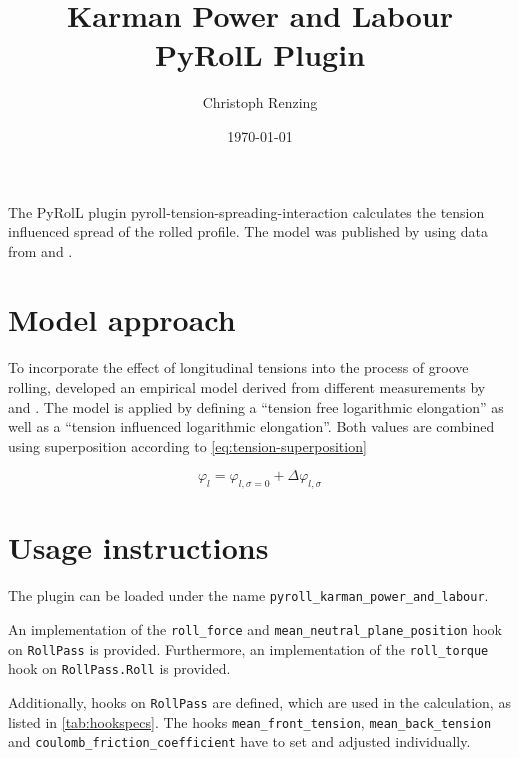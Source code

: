 \documentclass[11pt]{PyRollDocs}
\begin{document}
    \title{Karman Power and Labour PyRolL Plugin}
    \author{Christoph Renzing}
    \date{\today}

    \maketitle

    The PyRolL plugin pyroll-tension-spreading-interaction calculates the tension influenced spread of the rolled profile.
    The model was published by \textcite{Dobler1998, MaukDobler1999} using data from \textcite{Nikkilä1977} and \textcite{Treis1968}.


    \section{Model approach}\label{sec:model-approach}
    To incorporate the effect of longitudinal tensions into the process of groove rolling, \textcite{Dobler1998} developed an empirical model derived from different measurements by \textcite{Nikkilä1977} and \textcite{Treis1968}.
    The model is applied by defining a \enquote{tension free logarithmic elongation} as well as a \enquote{tension influenced logarithmic elongation}.
    Both values are combined using superposition according to \autoref{eq:tension-superposition}

    \begin{equation}
        \varphi_l = \varphi_{l, \sigma=0} + \Delta\varphi_{l, \sigma}
        \label{eq:tension-superposition}
    \end{equation}

    \section{Usage instructions}\label{sec:usage-instructions}
    The plugin can be loaded under the name \texttt{pyroll\_karman\_power\_and\_labour}.

    An implementation of the \lstinline{roll_force} and \lstinline{mean_neutral_plane_position} hook on \lstinline{RollPass} is provided.
    Furthermore, an implementation of the \lstinline{roll_torque} hook on \lstinline{RollPass.Roll} is provided.

    Additionally, hooks on \lstinline{RollPass} are defined, which are used in the calculation, as listed in \autoref{tab:hookspecs}.
    The hooks \lstinline{mean_front_tension}, \lstinline{mean_back_tension} and \lstinline{coulomb_friction_coefficient} have to set and adjusted individually.
\end{document}
